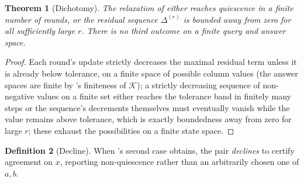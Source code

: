 \documentclass[11pt,twocolumn,a4paper]{article}
\theoremstyle{rdm}
\newtheorem{theorem}{Theorem}[section]
\theoremstyle{definition}
\newtheorem{definition}[theorem]{Definition}
\theoremstyle{remark}
\newcommand{\Know}{\mathcal{K}}
\newcommand{\dem}{\Delta}
\begin{document}
\begin{theorem}[Dichotomy]
\label{thm:dichotomy-formal}
The relaxation of  either reaches quiescence in a finite
number of rounds, or the residual sequence $\dem^{(r)}$ is bounded away from
zero for all sufficiently large $r$. There is no third outcome on a finite
query and answer space.
\end{theorem}

\begin{proof}
Each round's update strictly decreases the maximal residual term unless it
is already below tolerance, on a finite space of possible column values (the
answer spaces are finite by 's finiteness of $\Know$);
a strictly decreasing sequence of non-negative values on a finite set either
reaches the tolerance band in finitely many steps or the sequence's
decrements themselves must eventually vanish while the value remains above
tolerance, which is exactly boundedness away from zero for large $r$; these
exhaust the possibilities on a finite state space.
\end{proof}

\begin{definition}[Decline]
\label{def:decline}
When 's second case obtains, the pair
\emph{declines} to certify agreement on $x$, reporting non-quiescence rather
than an arbitrarily chosen one of $a,b$.
\end{definition}
\end{document}
